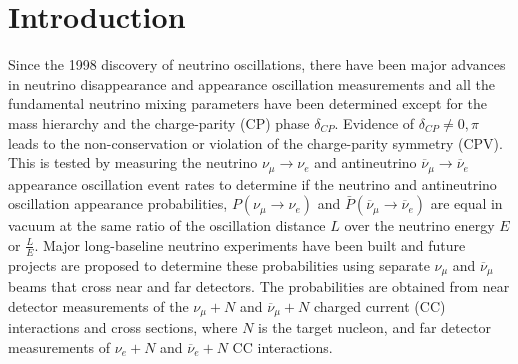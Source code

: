 \section{Introduction}

Since the 1998 discovery \citep{fukuda} of neutrino oscillations,
there have been major advances in neutrino disappearance
and appearance  oscillation measurements
and all the fundamental neutrino mixing parameters \citep{PDG-2016} have been determined
except for the mass hierarchy and the charge-parity (CP)
phase $\delta_{CP}$. 
Evidence of $\delta_{CP}\ne 0, \pi$  leads to the non-conservation or violation
of the charge-parity symmetry (CPV).
This is tested by measuring the neutrino $\nu_{\mu}\rightarrow\nu_{e}$ and antineutrino
$\overline{\nu}_{\mu}\rightarrow\overline{\nu}_{e}$ appearance oscillation
event rates to determine if the neutrino and antineutrino oscillation appearance probabilities, 
$P\left(\nu_{\mu}\rightarrow\nu_{e}\right)$
and
$\bar{P}\left(\overline{\nu}_{\mu}\rightarrow\overline{\nu}_{e}\right)$
are equal in vacuum \citep{msw}
at the same ratio of  
the oscillation distance $L$
over
the neutrino energy $E$ or $\frac{L}{E}$.
Major %
long-baseline neutrino experiments \citep{t2k+nova} have been built
and future projects \citep{dune+hyperk} are proposed to determine
these probabilities  using separate $\nu_{\mu}$ and $\overline{\nu}_{\mu}$ beams
that cross near and far detectors. 
The probabilities are obtained from near detector measurements of the 
$\nu_{\mu}+N$ and $\overline{\nu}_{\mu}+N$ charged current (CC) interactions and cross sections,
where $N$ is the target nucleon, 
and far detector measurements of $\nu_{e}+N$ and $\overline{\nu}_{e}+N$ CC interactions. 

